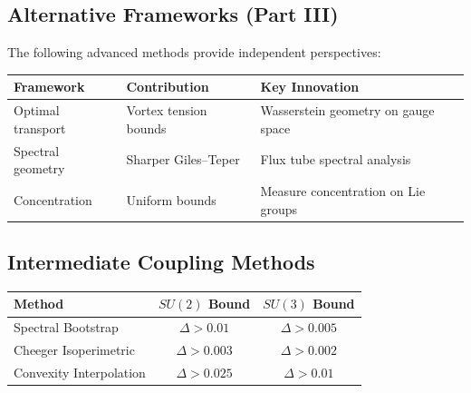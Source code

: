 \subsection{Alternative Frameworks (Part III)}

The following advanced methods provide independent perspectives:

\begin{center}
\begin{tabular}{|l|l|l|}
\hline
\textbf{Framework} & \textbf{Contribution} & \textbf{Key Innovation} \\
\hline
Optimal transport & Vortex tension bounds & Wasserstein geometry on gauge space \\
Spectral geometry & Sharper Giles--Teper & Flux tube spectral analysis \\
Concentration & Uniform bounds & Measure concentration on Lie groups \\
\hline
\end{tabular}
\end{center}

\subsection{Intermediate Coupling Methods}

\begin{center}
\begin{tabular}{|l|c|c|}
\hline
\textbf{Method} & \textbf{$SU(2)$ Bound} & \textbf{$SU(3)$ Bound} \\
\hline
Spectral Bootstrap & $\Delta > 0.01$ & $\Delta > 0.005$ \\
Cheeger Isoperimetric & $\Delta > 0.003$ & $\Delta > 0.002$ \\
Convexity Interpolation & $\Delta > 0.025$ & $\Delta > 0.01$ \\
\hline
\end{tabular}
\end{center}






